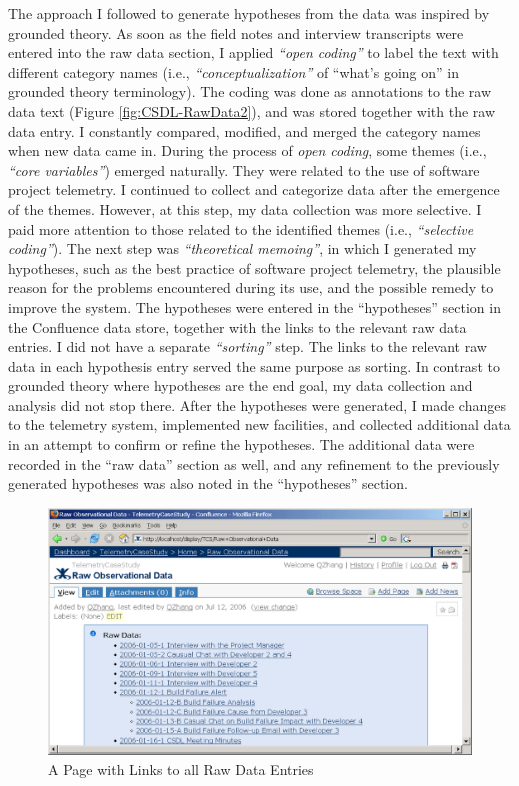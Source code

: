 The approach I followed to generate hypotheses from the data was inspired by grounded theory. 
As soon as the field notes and interview transcripts were entered into the raw data section, I applied \textit{``open coding''} to label the text with different category names (i.e., \textit{``conceptualization''} of ``what's going on'' in grounded theory terminology). The coding was done as annotations to the raw data text (Figure   \ref{fig:CSDL-RawData2}), and was stored together with the raw data entry. I constantly compared, modified, and merged the category names when new data came in. During the process of \textit{open coding}, some themes (i.e., \textit{``core variables''}) emerged naturally. They were related to the use of software project telemetry. I continued to collect and categorize data after the emergence of the themes. However, at this step, my data collection was more selective. I paid more attention to those related to the identified themes (i.e., \textit{``selective coding''}).
The next step was \textit{``theoretical memoing''}, in which I generated my hypotheses, such as the best practice of software project telemetry, the plausible reason for the problems encountered during its use, and the possible remedy to improve the system. The hypotheses were entered in the ``hypotheses'' section in the Confluence data store, together with the links to the relevant raw data entries. I did not have a separate \textit{``sorting''} step. The links to the relevant raw data in each hypothesis entry served the same purpose as sorting.
In contrast to grounded theory where hypotheses are the end goal, my data collection and analysis did not stop there. After the hypotheses were generated, I made changes to the telemetry system, implemented new facilities, and collected additional data in an attempt to confirm or refine the hypotheses. The additional data were recorded in the ``raw data'' section as well, and any refinement to the previously generated hypotheses was also noted in the ``hypotheses'' section.


\begin{figure}[p]
  \center
  \includegraphics[width=1.00\textwidth]{figures/CSDL-RawData1}
  \caption{A Page with Links to all Raw Data Entries} 
  \label{fig:CSDL-RawData1}
\end{figure}
	
